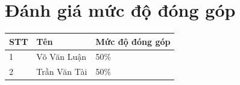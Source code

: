 \documentclass[a4paper]{article}
\begin{document}
\newpage
\section*{Đánh giá mức độ đóng góp}
        \begin{table}[h]
        \centering
            \begin{tabular}{|l|l|l|}
            \hline
            STT & Tên & Mức độ đóng góp\\
            \hline
            1 & Võ Văn Luận & 50\%\\
            \hline
            2 & Trần Văn Tài & 50\%\\           
            \hline
            \end{tabular}
        \end{table}  

\listoffigures
\newpage
\end{document}
